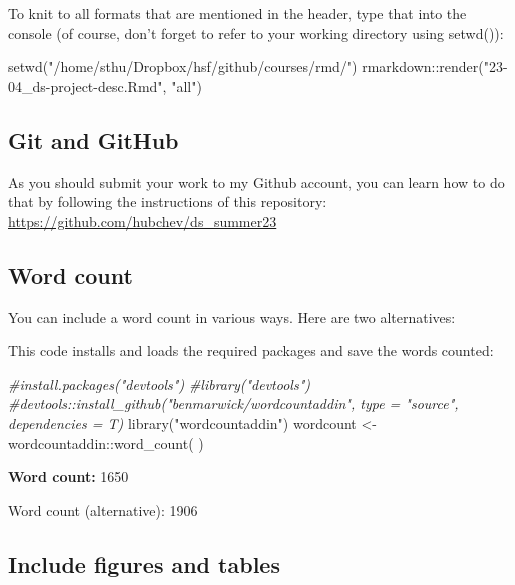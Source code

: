 \documentclass[
  12pt,
]{article}
\newenvironment{Shaded}{\begin{snugshade}}{\end{snugshade}}
\newcommand{\CommentTok}[1]{\textcolor[rgb]{0.56,0.35,0.01}{\textit{#1}}}
\newcommand{\FunctionTok}[1]{\textcolor[rgb]{0.00,0.00,0.00}{#1}}
\newcommand{\NormalTok}[1]{#1}
\newcommand{\OtherTok}[1]{\textcolor[rgb]{0.56,0.35,0.01}{#1}}
\newcommand{\SpecialCharTok}[1]{\textcolor[rgb]{0.00,0.00,0.00}{#1}}
\newcommand{\StringTok}[1]{\textcolor[rgb]{0.31,0.60,0.02}{#1}}
\begin{document}
To knit to all formats that are mentioned in the header, type that into the console (of course, don't forget to refer to your working directory using setwd()):

\begin{Shaded}
\begin{Highlighting}[]
\FunctionTok{setwd}\NormalTok{(}\StringTok{"/home/sthu/Dropbox/hsf/github/courses/rmd/"}\NormalTok{)}
\NormalTok{rmarkdown}\SpecialCharTok{::}\FunctionTok{render}\NormalTok{(}\StringTok{"23{-}04\_ds{-}project{-}desc.Rmd"}\NormalTok{, }\StringTok{"all"}\NormalTok{)}
\end{Highlighting}
\end{Shaded}

\hypertarget{git-and-github}{%
\subsection{Git and GitHub}\label{git-and-github}}

As you should submit your work to my Github account, you can learn how to do that by following the instructions of this repository: \url{https://github.com/hubchev/ds_summer23}

\hypertarget{word-count}{%
\subsection{Word count}\label{word-count}}

You can include a word count in various ways. Here are two alternatives:

This code installs and loads the required packages and save the words counted:

\begin{Shaded}
\begin{Highlighting}[]
\CommentTok{\#install.packages("devtools")}
\CommentTok{\#library("devtools")}
\CommentTok{\#devtools::install\_github("benmarwick/wordcountaddin", type = "source", dependencies = T)}
\FunctionTok{library}\NormalTok{(}\StringTok{"wordcountaddin"}\NormalTok{)}
\NormalTok{wordcount }\OtherTok{\textless{}{-}}\NormalTok{ wordcountaddin}\SpecialCharTok{::}\FunctionTok{word\_count}\NormalTok{( )}
\end{Highlighting}
\end{Shaded}

\textbf{Word count:} 1650

Word count (alternative): 1906

\hypertarget{include-figures-and-tables}{%
\subsection{Include figures and tables}\label{include-figures-and-tables}}
\end{document}
